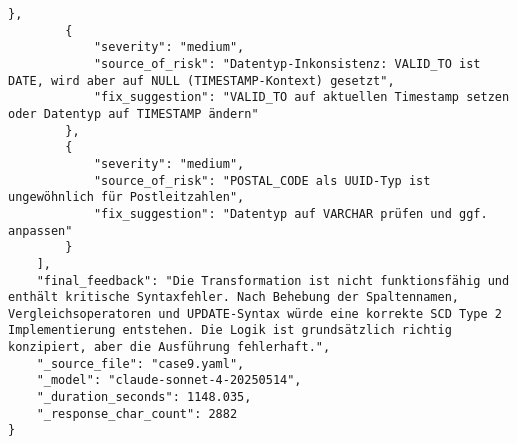 \begin{lstlisting}[caption={Ausgabe: Claude Sonnet 4 Anwendungsfall 9 Hauptdurchlauf},label={claude_case9_prompt1}]
        },
        {
            "severity": "medium",
            "source_of_risk": "Datentyp-Inkonsistenz: VALID_TO ist DATE, wird aber auf NULL (TIMESTAMP-Kontext) gesetzt",
            "fix_suggestion": "VALID_TO auf aktuellen Timestamp setzen oder Datentyp auf TIMESTAMP ändern"
        },
        {
            "severity": "medium",
            "source_of_risk": "POSTAL_CODE als UUID-Typ ist ungewöhnlich für Postleitzahlen",
            "fix_suggestion": "Datentyp auf VARCHAR prüfen und ggf. anpassen"
        }
    ],
    "final_feedback": "Die Transformation ist nicht funktionsfähig und enthält kritische Syntaxfehler. Nach Behebung der Spaltennamen, Vergleichsoperatoren und UPDATE-Syntax würde eine korrekte SCD Type 2 Implementierung entstehen. Die Logik ist grundsätzlich richtig konzipiert, aber die Ausführung fehlerhaft.",
    "_source_file": "case9.yaml",
    "_model": "claude-sonnet-4-20250514",
    "_duration_seconds": 1148.035,
    "_response_char_count": 2882
}
\end{lstlisting}

